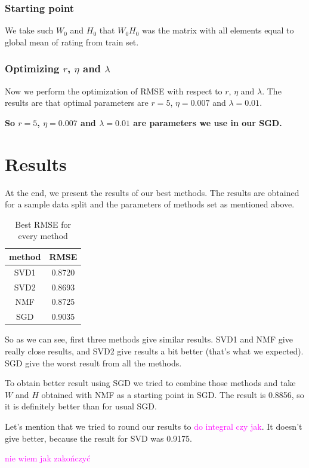 \documentclass[10pt]{amsart}
\newcommand{\tami}[1]{{\textcolor{magenta}{#1}}}
\begin{document}
\subsubsection*{Starting point}
We take such $W_0$ and $H_0$ that $W_{0} H_0$ was the matrix with all elements equal to global mean of rating from train set.

\subsubsection*{Optimizing $r$, $\eta$ and $\lambda$}
Now we perform the optimization of RMSE with respect to $r$, $\eta$ and $\lambda$.
The results are that optimal parameters are $r=5$, $\eta = 0.007$ and $\lambda = 0.01$.

\textbf{So $r=5$, $\eta = 0.007$ and $\lambda = 0.01$ are parameters we use in our SGD.}






\section{Results}

At the end, we present the results of our best methods.
The results are obtained for a sample data split and the parameters of methods set as mentioned above.

\begin{table}[H]
\centering
\begin{tabular}{c|c}
method & RMSE \\
\hline
SVD1 & 0.8720 \\
SVD2 & 0.8693 \\
NMF & 0.8725 \\
SGD & 0.9035 \\
\end{tabular}
\caption{Best RMSE for every method}
\end{table}
So as we can see, first three methods give similar results.
SVD1 and NMF give really close results, and SVD2 give results a bit better (that's what we expected).
SGD give the worst result from all the methods.

To obtain better result using SGD we tried to combine those methods and take $W$ and $H$ obtained with NMF as a starting point in SGD.
The result is 0.8856, so it is definitely better than for usual SGD.

Let's mention that we tried to round our results to \tami{do integral czy jak}.
It doesn't give better, because the result for SVD was 0.9175.

\tami{nie wiem jak zakończyć}
\end{document}
